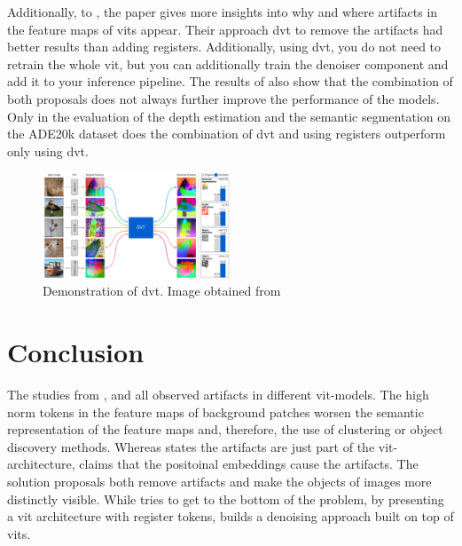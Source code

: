 \documentclass[conference]{IEEEtran}
\begin{document}
  Additionally, to \citeauthor{registers} \cite{registers}, the paper gives more insights into why and where artifacts in the feature maps of \acp{vit} appear. Their approach \ac{dvt} to remove the artifacts had better results than \citeauthor{registers} \cite{registers} adding registers. Additionally, using \ac{dvt}, you do not need to retrain the whole \ac{vit}, but you can additionally train the denoiser component and add it to your inference pipeline. The results of \citeauthor{denoising} \cite{denoising} also show that the combination of both proposals does not always further improve the performance of the models. Only in the evaluation of the depth estimation and the semantic segmentation on the ADE20k dataset does the combination of \ac{dvt} and using registers outperform only using \ac{dvt}. \cite{denoising}
 
  \begin{figure}
    \centering
    \includegraphics[width=0.5\textwidth]{figures/artifacts-positions.png}
    \caption{Demonstration of \ac{dvt}. Image obtained from \cite{denoising}}
    \label{fig:artifacts-positions}
  \end{figure}

  \section{Conclusion}
  \label{sec:conclusion}

  The studies from \citeauthor{registers} \cite{registers}, \citeauthor{mamba-needs-registers} \cite{mamba-needs-registers} and \citeauthor{denoising} \cite{denoising} all observed artifacts in different \ac{vit}-models. The high norm tokens in the feature maps of background patches worsen the semantic representation of the feature maps and, therefore, the use of clustering or object discovery methods. Whereas \citeauthor{registers} \cite{registers} states the artifacts are just part of the \ac{vit}-architecture, \citeauthor{denoising} \cite{denoising} claims that the positoinal embeddings cause the artifacts. The solution proposals both remove artifacts and make the objects of images more distinctly visible. While \citeauthor{registers} \cite{registers} tries to get to the bottom of the problem, by presenting a \ac{vit} architecture with register tokens, \citeauthor{denoising} \cite{denoising} builds a denoising approach built on top of \acp{vit}. 
  
\end{document}
